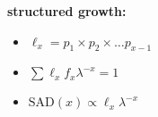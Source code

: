 \textbf{structured growth:}
\begin{itemize}
\item $\ell_x= p_1 \times p_2 \times \ldots p_{x-1}$
\item $\sum \ell_x f_x \lambda^{-x} = 1$
\item $\textrm{SAD}(x) \propto \ell_x \lambda^{-x}$
\end{itemize}
